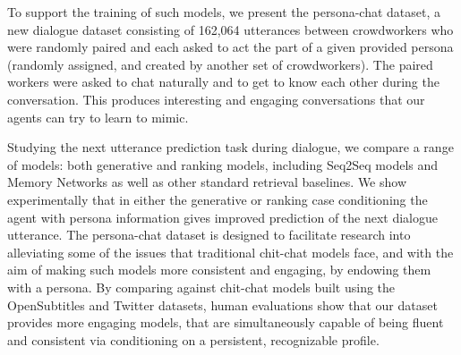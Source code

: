 To support the training of such models, we present the {\sc persona-chat} dataset, a new dialogue dataset consisting of 162,064 utterances 
between crowdworkers who were randomly paired and each asked to act the part of a given provided persona (randomly assigned, and created by another set of crowdworkers). The paired workers were asked to chat naturally and to get to know each other during the conversation. This produces interesting and engaging conversations that our agents can try to learn to mimic. 



Studying the next utterance prediction task during dialogue, we compare a range of models: both generative and ranking models, including Seq2Seq models and Memory Networks \citep{memn2n} as well as other standard retrieval baselines. 
We show experimentally that in either the generative or ranking case 
conditioning the agent with persona information  
gives improved prediction of the next dialogue utterance.  
The {\sc persona-chat} dataset is designed to facilitate research into alleviating some of the issues that traditional chit-chat models face, and with the aim of making such models more consistent and engaging, by endowing them with a persona.
By comparing against chit-chat models built using the OpenSubtitles and Twitter datasets,
human evaluations show that our dataset provides more engaging models,
that are simultaneously capable of being fluent and consistent via conditioning on a persistent, recognizable profile.
